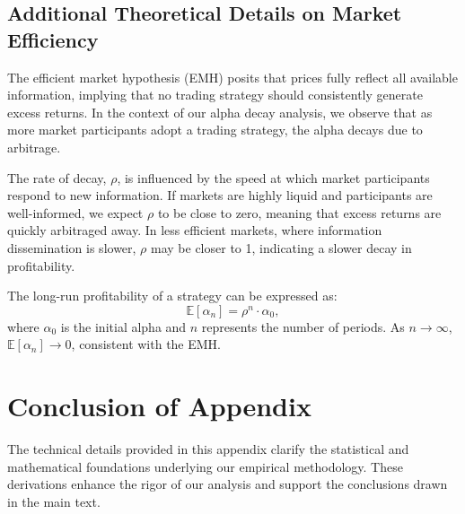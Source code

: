 \subsection{Additional Theoretical Details on Market Efficiency}

The efficient market hypothesis (EMH) posits that prices fully reflect all available information, implying that no trading strategy should consistently generate excess returns. In the context of our alpha decay analysis, we observe that as more market participants adopt a trading strategy, the alpha decays due to arbitrage.

The rate of decay, $\rho$, is influenced by the speed at which market participants respond to new information. If markets are highly liquid and participants are well-informed, we expect $\rho$ to be close to zero, meaning that excess returns are quickly arbitraged away. In less efficient markets, where information dissemination is slower, $\rho$ may be closer to 1, indicating a slower decay in profitability.

The long-run profitability of a strategy can be expressed as:
\[
\mathbb{E}[\alpha_n] = \rho^n \cdot \alpha_0,
\]
where $\alpha_0$ is the initial alpha and $n$ represents the number of periods. As $n \to \infty$, $\mathbb{E}[\alpha_n] \to 0$, consistent with the EMH.

\section{Conclusion of Appendix}

The technical details provided in this appendix clarify the statistical and mathematical foundations underlying our empirical methodology. These derivations enhance the rigor of our analysis and support the conclusions drawn in the main text.
